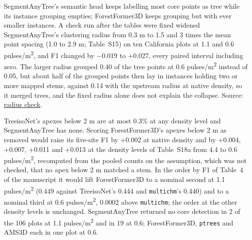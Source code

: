 \documentclass[10pt,a4paper]{article}
\begin{document}
SegmentAnyTree's semantic head keeps labelling most core points as tree while
its instance grouping empties; ForestFormer3D keeps grouping but with ever
smaller instances. A check run after the tables were fixed widened
SegmentAnyTree's clustering radius from 0.3 m to 1.5 and 3 times the mean point
spacing (1.0 to 2.9 m; Table~S15) on ten California plots at 1.1 and 0.6
pulses/m\textsuperscript{2}, and F1 changed by $-$0.019 to +0.027, every paired interval including
zero. The larger radius grouped 0.40 of the tree points at 0.6 pulses/m\textsuperscript{2} instead
of 0.05, but about half of the grouped points then lay in instances holding two
or more mapped stems, against 0.14 with the upstream radius at native density,
so it merged trees, and the fixed radius alone does not explain the collapse.
Source: \href{https://github.com/devakellc/lidar-tree-benchmark/blob/main/results/segmentanytree-radius-results.md}{radius check}.

TreeisoNet's apexes below 2 m are at most 0.3\% at any density level and
SegmentAnyTree has none. Scoring ForestFormer3D's apexes below 2 m as removed
would raise its five-site F1 by +0.002 at native density and by +0.004, +0.007,
+0.011 and +0.013 at the density levels of Table~S18a from 4.4 to 0.6 pulses/m\textsuperscript{2},
recomputed from the pooled counts on the assumption, which was not checked, that
no apex below 2 m matched a stem. In the order by F1 of Table~4 of the
manuscript it would lift ForestFormer3D to a nominal second at 1.1 pulses/m\textsuperscript{2}
(0.449 against TreeisoNet's 0.444 and \texttt{multichm}'s 0.440) and to a nominal third
at 0.6 pulses/m\textsuperscript{2}, 0.0002 above \texttt{multichm}; the order at the other density levels
is unchanged. SegmentAnyTree returned no core detection in 2 of the 106 plots at
1.1 pulses/m\textsuperscript{2} and in 19 at 0.6; ForestFormer3D, \texttt{ptrees} and AMS3D each in one
plot at 0.6.
\end{document}
